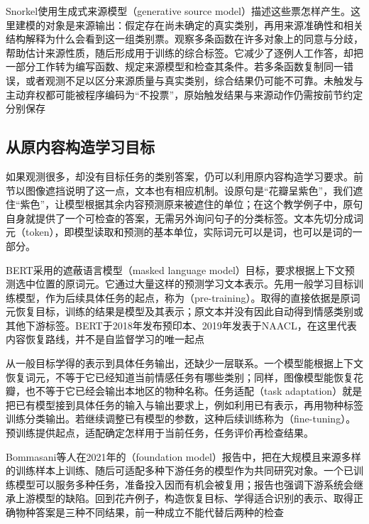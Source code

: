 Snorkel使用生成式来源模型（generative source model）描述这些票怎样产生。这里建模的对象是来源输出：假定存在尚未确定的真实类别，再用来源准确性和相关结构解释为什么会看到这一组类别票。观察多条函数在许多对象上的同意与分歧，帮助估计来源性质，随后形成用于训练的综合标签。它减少了逐例人工作答，却把一部分工作转为编写函数、规定来源模型和检查其条件。若多条函数复制同一错误，或者观测不足以区分来源质量与真实类别，综合结果仍可能不可靠。未触发与主动弃权都可能被程序编码为“不投票”，原始触发结果与来源动作仍需按前节约定分别保存

\subsection{从原内容构造学习目标}
\label{sec:knowledge-acquisition-history-internal-target}

如果观测很多，却没有目标任务的类别答案，仍可以利用原内容构造学习要求。前节以图像遮挡说明了这一点，文本也有相应机制。设原句是“花瓣呈紫色”，我们遮住“紫色”，让模型根据其余内容预测原来被遮住的单位；在这个教学例子中，原句自身就提供了一个可检查的答案，无需另外询问句子的分类标签。文本先切分成词元（token），即模型读取和预测的基本单位，实际词元可以是词，也可以是词的一部分。

BERT采用的遮蔽语言模型（masked language model）目标，要求根据上下文预测选中位置的原词元。它通过大量这样的预测学习文本表示。先用一般学习目标训练模型，作为后续具体任务的起点，称为（pre-training）。取得的直接依据是原词元恢复目标，训练的结果是模型及其表示；原文本并没有因此自动得到情感类别或其他下游标签。BERT于2018年发布预印本、2019年发表于NAACL，在这里代表内容恢复路线，并不是自监督学习的唯一起点

从一般目标学得的表示到具体任务输出，还缺少一层联系。一个模型能根据上下文恢复词元，不等于它已经知道当前情感任务有哪些类别；同样，图像模型能恢复花瓣，也不等于它已经会输出本地区的物种名称。任务适配（task adaptation）就是把已有模型接到具体任务的输入与输出要求上，例如利用已有表示，再用物种标签训练分类输出。若继续调整已有模型的参数，这种后续训练称为（fine-tuning）。预训练提供起点，适配确定怎样用于当前任务，任务评价再检查结果。

Bommasani等人在2021年的（foundation model）报告中，把在大规模且来源多样的训练样本上训练、随后可适配多种下游任务的模型作为共同研究对象。一个已训练模型可以服务多种任务，准备投入因而有机会被复用；报告也强调下游系统会继承上游模型的缺陷。回到花卉例子，构造恢复目标、学得适合识别的表示、取得正确物种答案是三种不同结果，前一种成立不能代替后两种的检查


